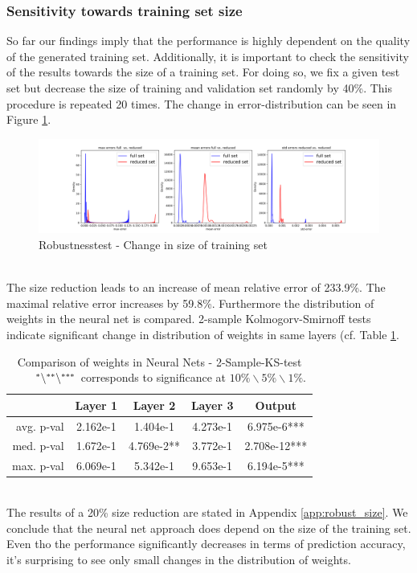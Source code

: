 \documentclass{article}
\begin{document}
\subsubsection{Sensitivity towards training set size} \label{sec:robust_size}
So far our findings imply that the performance is highly dependent on the quality of the generated training set. Additionally, it is important to check the sensitivity of the results towards the size of a training set. For doing so, we fix a given test set but decrease the size of training and validation set randomly by 40\%. This procedure is repeated 20 times. The change in error-distribution can be seen in Figure
\ref{fig:trainset_sensitivity}.
\begin{figure}[!ht]
    \centering
    \includegraphics[width=\textwidth]{RobustnessSize.png}
    \caption{Robustnesstest - Change in size of training set}
    \label{fig:trainset_sensitivity}
\end{figure}
  \\ 
The size reduction leads to an increase of mean relative error of 233.9\%. The maximal relative error increases by  59.8\%.  Furthermore the distribution of weights in the neural net is compared. 2-sample Kolmogorv-Smirnoff tests indicate significant change in distribution of weights in same layers (cf. Table \ref{tab:weights_size}. 
\captionsetup{justification=centering}
\begin{table}[!ht]
    \centering
    \begin{tabular}{|r|c|c|c|c|}\hline
     & Layer 1     &  Layer 2     & Layer 3 &    Output\\\hline
    avg. p-val & 2.162e-1 & 1.404e-1& 4.273e-1& 6.975e-6***\\\hline
    med. p-val & 1.672e-1 & 4.769e-2**& 3.772e-1& 2.708e-12***\\\hline
    max. p-val & 6.069e-1 & 5.342e-1& 9.653e-1& 6.194e-5***\\\hline
    \end{tabular}\vspace{0.1cm}
    \caption{Comparison of weights in Neural Nets - 2-Sample-KS-test\\ $\hspace{0.7cm}^*\backslash^{**}\backslash^{***}$ corresponds to significance at $10\%\backslash5\%\backslash1\%$.}
    \label{tab:weights_size}
\end{table}\\
The results of a 20\% size reduction are stated in Appendix \ref{app:robust_size}.
We conclude that the neural net approach does depend on the size of the training set. Even tho the performance significantly decreases 
in terms of prediction accuracy, it's surprising to see only small changes in the distribution of weights.
\end{document}
